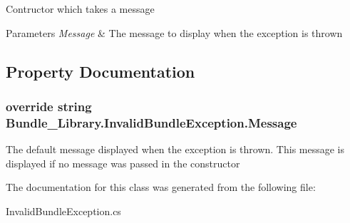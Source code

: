 Contructor which takes a message 


\begin{DoxyParams}{Parameters}
{\em Message} & The message to display when the exception is thrown\\
\hline
\end{DoxyParams}


\subsection{Property Documentation}
\subsubsection[{Message}]{\setlength{\rightskip}{0pt plus 5cm}override string Bundle\+\_\+\+Library.\+Invalid\+Bundle\+Exception.\+Message\hspace{0.3cm}{\ttfamily [get]}}\label{class_bundle___library_1_1_invalid_bundle_exception_ad8726c1e618cb38e63240def5a57733e}


The default message displayed when the exception is thrown. This message is displayed if no message was passed in the constructor 



The documentation for this class was generated from the following file\+:\begin{DoxyCompactItemize}
\item 
Invalid\+Bundle\+Exception.\+cs\end{DoxyCompactItemize}

